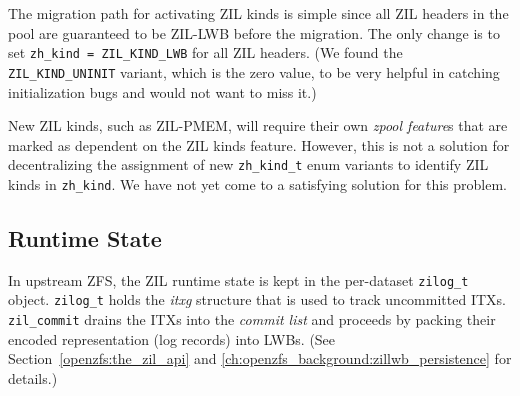 \documentclass[12pt,a4paper,twoside]{book}
\begin{document}
The migration path for activating ZIL kinds is simple since all ZIL headers in the pool are guaranteed to be ZIL-LWB before the migration.
The only change is to set \lstinline{zh_kind = ZIL_KIND_LWB} for all ZIL headers.
(We found the \lstinline{ZIL_KIND_UNINIT} variant, which is the zero value, to be very helpful in catching initialization bugs and would not want to miss it.)

New ZIL kinds, such as ZIL-PMEM, will require their own \textit{zpool feature}s that are marked as dependent on the ZIL kinds feature.
However, this is not a solution for decentralizing the assignment of new \lstinline{zh_kind_t} enum variants to identify ZIL kinds in \lstinline{zh_kind}.
We have not yet come to a satisfying solution for this problem.

\subsection{Runtime State}\label{sec:zil_kinds:runtime}
In upstream ZFS, the ZIL runtime state is kept in the per-dataset \lstinline{zilog_t} object.
\lstinline{zilog_t} holds the \textit{itxg} structure that is used to track uncommitted ITXs.
\lstinline{zil_commit} drains the ITXs into the \textit{commit list} and proceeds by packing their encoded representation (log records) into LWBs.
(See Section~\ref{openzfs:the_zil_api} and \ref{ch:openzfs_background:zillwb_persistence} for details.)
\end{document}
